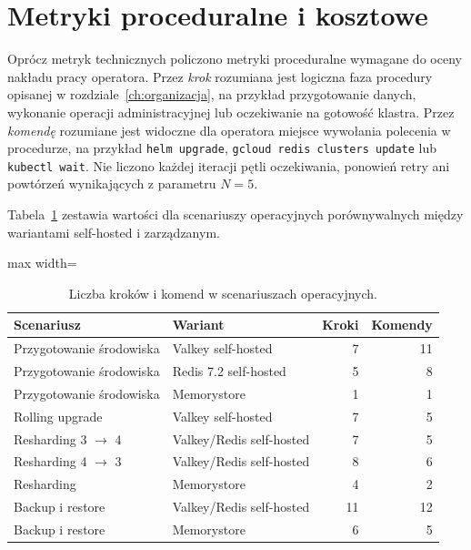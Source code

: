 \section{Metryki proceduralne i kosztowe}

Oprócz metryk technicznych policzono metryki proceduralne wymagane do oceny nakładu pracy operatora. Przez \textit{krok} rozumiana jest logiczna faza procedury opisanej w rozdziale~\ref{ch:organizacja}, na przykład przygotowanie danych, wykonanie operacji administracyjnej lub oczekiwanie na gotowość klastra. Przez \textit{komendę} rozumiane jest widoczne dla operatora miejsce wywołania polecenia w procedurze, na przykład \texttt{helm upgrade}, \texttt{gcloud redis clusters update} lub \texttt{kubectl wait}. Nie liczono każdej iteracji pętli oczekiwania, ponowień retry ani powtórzeń wynikających z parametru $N=5$.

Tabela~\ref{tab:procedural-metrics} zestawia wartości dla scenariuszy operacyjnych porównywalnych między wariantami self-hosted i zarządzanym.

\begin{table}[htbp]
\centering
\caption{Liczba kroków i komend w scenariuszach operacyjnych.}
\label{tab:procedural-metrics}
\begin{adjustbox}{max width=\textwidth}
\begin{tabular}{llrr}
\toprule
Scenariusz & Wariant & Kroki & Komendy \\
\midrule
Przygotowanie środowiska & Valkey self-hosted & 7 & 11 \\
Przygotowanie środowiska & Redis 7.2 self-hosted & 5 & 8 \\
Przygotowanie środowiska & Memorystore & 1 & 1 \\
Rolling upgrade & Valkey self-hosted & 7 & 5 \\
Resharding 3 $\rightarrow$ 4 & Valkey/Redis self-hosted & 7 & 5 \\
Resharding 4 $\rightarrow$ 3 & Valkey/Redis self-hosted & 8 & 6 \\
Resharding & Memorystore & 4 & 2 \\
Backup i restore & Valkey/Redis self-hosted & 11 & 12 \\
Backup i restore & Memorystore & 6 & 5 \\
\bottomrule
\end{tabular}
\end{adjustbox}
\end{table}

\FloatBarrier

